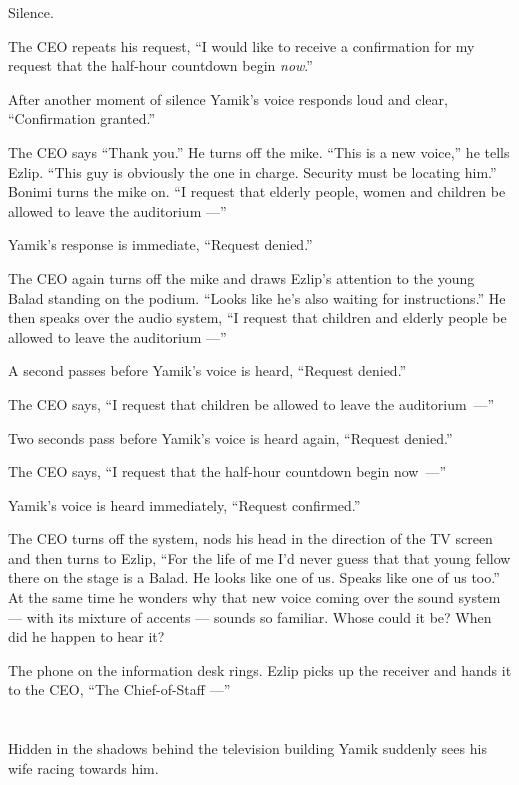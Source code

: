 \documentclass[twoside,11pt,openany]{book}
\begin{document}
Silence.

The CEO repeats his request, ``I would like to receive a confirmation for my request that the half-hour
countdown begin \textit{now}.''

After another moment of silence Yamik's voice responds loud and clear, ``Confirmation
granted.''

The CEO says ``Thank you.'' He turns off the mike. ``This is a new voice,'' he
tells Ezlip. ``This guy is{ }obviously the one in charge. Security must
be{ }locating him.'' Bonimi turns the mike on. ``I request that elderly
people, women and children be allowed to leave the auditorium ---''

Yamik's response is immediate, ``Request denied.''

The CEO again turns off the mike and draws Ezlip's attention to the young Balad standing on the podium. ``Looks like
he's also waiting for instructions.'' He then speaks over the audio system, ``I request that
children and elderly people be allowed to leave the auditorium ---''

A second passes before Yamik's voice is heard, ``Request denied.''

The CEO says, ``I request that children be allowed to leave the auditorium~---''

Two seconds pass before Yamik's voice is heard again, ``Request denied.''

The CEO says, ``I request that the half-hour countdown begin now~---''

Yamik's voice is heard immediately, ``Request confirmed.''

The CEO turns off the system, nods his head in the direction of the TV screen and then turns
to Ezlip, ``For the life of me I'd never guess that that young
fellow there on the stage is a Balad. He looks like one of us. Speaks like one of us too.'' At the
same time he wonders why that new voice coming over the sound system --- with its mixture of accents --- sounds so
familiar. Whose could it be? When did he happen to hear it?

The phone on the information desk rings.  Ezlip picks up the receiver and hands it to the CEO, ``The
Chief-of-Staff ---''


\chapter{}

Hidden in the shadows behind the television building Yamik suddenly sees his wife racing towards him.
\end{document}
